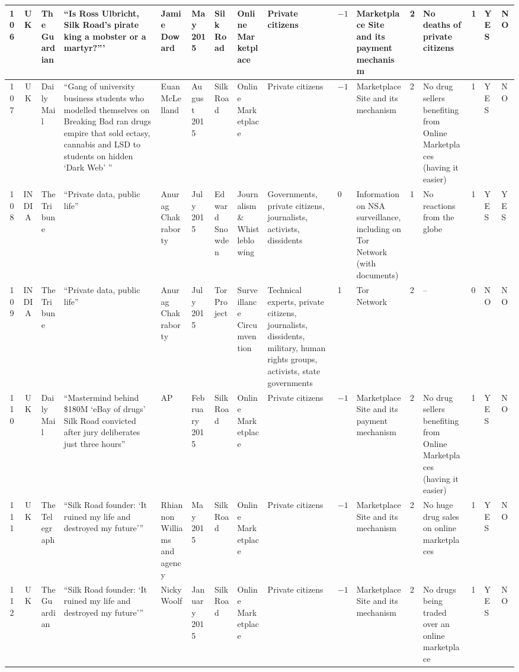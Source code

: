 \begin{landscape}
{\begin{longtable}{|c|c|p{1.2cm}|p{2.5cm}|p{1.4cm}|p{1.2cm}|p{1.4cm}|p{1.2cm}|p{1.8cm}|p{0.4cm}|p{1.8cm}|p{0.4cm}|p{1.5cm}|p{0.4cm}|p{0.6cm}|p{0.6cm}|}
\hline
106 & UK & The Guardian & ``Is Ross Ulbricht, Silk Road's pirate king a mobster or a martyr?''' & Jamie Doward & May 2015 &Silk Road & Online Marketplace & Private citizens & $-1$ & Marketplace Site and its payment mechanism & 2 & No deaths of private citizens & 1 & YES & NO \\
\hline
107 & UK & Daily Mail & ``Gang of university business students who modelled themselves on Breaking Bad ran drugs empire that sold ectasy, cannabis and LSD to students on hidden `Dark Web' '' & Euan McLelland & August 2015 &Silk Road & Online Marketplace & Private citizens & $-1$ & Marketplace Site and its mechanism & 2 & No drug sellers benefiting from Online Marketplaces (having it easier) & 1 & YES & NO \\
\hline
108 & INDIA & The Tribune & ``Private data, public life'' & Anurag Chakraborty & July 2015 & Edward Snowden & Journalism \& Whistleblowing & Governments, private citizens, journalists, activists, dissidents & 0 & Information on NSA surveillance, including on Tor Network (with documents) & 1 & No reactions from the globe & 1 & YES & YES \\
\hline
109 & INDIA & The Tribune & ``Private data, public life'' & Anurag Chakraborty & July 2015 &Tor Project & Surveillance Circumvention & Technical experts, private citizens, journalists, dissidents, military, human rights groups, activists, state governments & 1 & Tor Network & 2 & -- & 0 & NO & NO \\
\hline
110 & UK & Daily Mail & ``Mastermind behind \$180M `eBay of drugs' Silk Road convicted after jury deliberates just three hours'' & AP & February 2015 &Silk Road & Online Marketplace & Private citizens & $-1$ & Marketplace Site and its payment mechanism & 2 & No drug sellers benefiting from Online Marketplaces (having it easier) & 1 & YES & NO \\
\hline
111 & UK & The Telegraph & ``Silk Road founder: `It ruined my life and destroyed my future''' & Rhiannon Williams and agency & May 2015 &Silk Road & Online Marketplace & Private citizens & $-1$ & Marketplace Site and its mechanism & 2 & No huge drug sales on online  marketplaces & 1 & YES & NO \\
\hline
112 & UK & The Guardian & ``Silk Road founder: `It ruined my life and destroyed my future''' & Nicky Woolf & January 2015 &Silk Road & Online Marketplace & Private citizens & $-1$ & Marketplace Site and its mechanism & 2 & No drugs being traded over an online marketplace & 1 & YES & NO \\
\hline

\end{longtable}}
\end{landscape}
